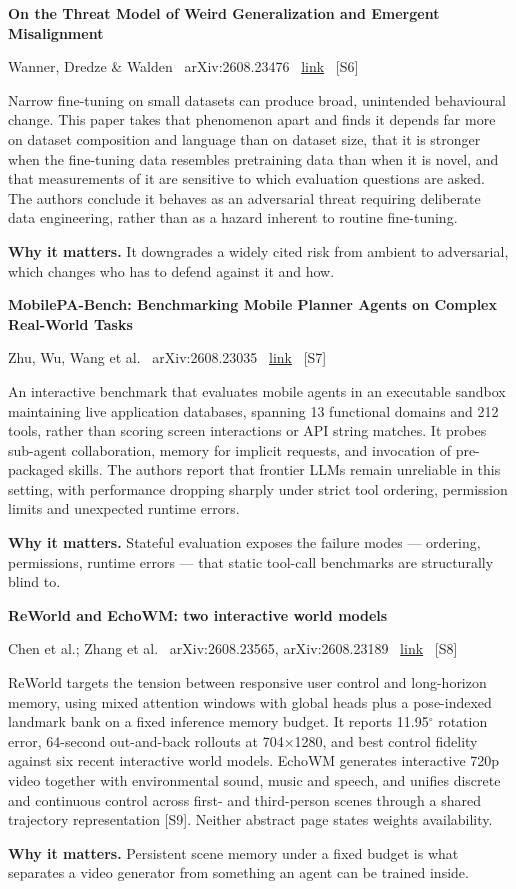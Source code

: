 \documentclass[11pt,a4paper]{article}
\newcommand{\entry}[4]{%
  \par\vspace{0.7em}%
  {\sffamily\bfseries\color{brandink}#1}\par
  {\footnotesize\color{brandgrey}#2 \textbullet\ \href{#3}{link} \textbullet\ \srcref{#4}}\par
  \vspace{0.15em}}
\newcommand{\why}[1]{\par{\small\textbf{Why it matters.} #1}\par}
\newcommand{\srcref}[1]{\textcolor{brandaccent}{[S#1]}}
\begin{document}
\entry{On the Threat Model of Weird Generalization and Emergent Misalignment}{Wanner, Dredze \& Walden \textbullet\ arXiv:2608.23476}{https://arxiv.org/abs/2608.23476}{6}
Narrow fine-tuning on small datasets can produce broad, unintended behavioural
change. This paper takes that phenomenon apart and finds it depends far more on
dataset composition and language than on dataset size, that it is stronger when
the fine-tuning data resembles pretraining data than when it is novel, and that
measurements of it are sensitive to which evaluation questions are asked. The
authors conclude it behaves as an adversarial threat requiring deliberate data
engineering, rather than as a hazard inherent to routine fine-tuning.
\why{It downgrades a widely cited risk from ambient to adversarial, which changes
who has to defend against it and how.}

\entry{MobilePA-Bench: Benchmarking Mobile Planner Agents on Complex Real-World Tasks}{Zhu, Wu, Wang et al. \textbullet\ arXiv:2608.23035}{https://arxiv.org/abs/2608.23035}{7}
An interactive benchmark that evaluates mobile agents in an executable sandbox
maintaining live application databases, spanning 13 functional domains and 212
tools, rather than scoring screen interactions or API string matches. It probes
sub-agent collaboration, memory for implicit requests, and invocation of
pre-packaged skills. The authors report that frontier LLMs remain unreliable in
this setting, with performance dropping sharply under strict tool ordering,
permission limits and unexpected runtime errors.
\why{Stateful evaluation exposes the failure modes --- ordering, permissions,
runtime errors --- that static tool-call benchmarks are structurally blind to.}

\entry{ReWorld and EchoWM: two interactive world models}{Chen et al.; Zhang et al. \textbullet\ arXiv:2608.23565, arXiv:2608.23189}{https://arxiv.org/abs/2608.23565}{8}
ReWorld targets the tension between responsive user control and long-horizon
memory, using mixed attention windows with global heads plus a pose-indexed
landmark bank on a fixed inference memory budget. It reports 11.95$^\circ$
rotation error, 64-second out-and-back rollouts at 704$\times$1280, and best
control fidelity against six recent interactive world models. EchoWM generates
interactive 720p video together with environmental sound, music and speech, and
unifies discrete and continuous control across first- and third-person scenes
through a shared trajectory representation \srcref{9}. Neither abstract page
states weights availability.
\why{Persistent scene memory under a fixed budget is what separates a video
generator from something an agent can be trained inside.}
\end{document}
